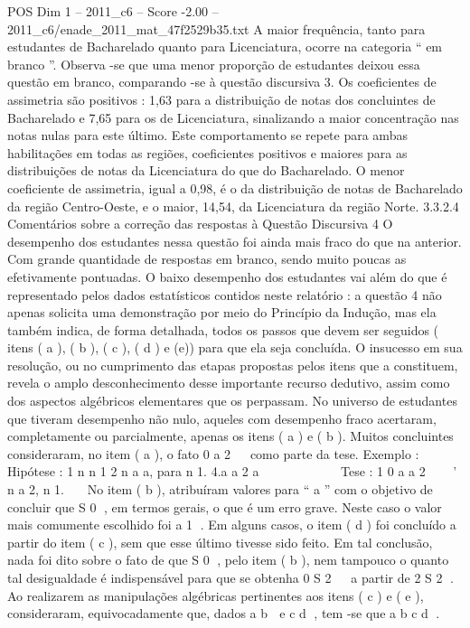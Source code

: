 \begin{textsample}{POS Dim 1 – 2011\_c6 – Score -2.00 – 2011\_c6/enade\_2011\_mat\_47f2529b35.txt}
A maior frequência, tanto para estudantes de Bacharelado quanto para Licenciatura, ocorre na categoria “ em branco ”.
Observa -se que uma menor proporção de estudantes deixou essa questão em branco, comparando -se à questão discursiva 3.
Os coeficientes de assimetria são positivos : 1,63 para a distribuição de notas dos concluintes de Bacharelado e 7,65 para os de Licenciatura, sinalizando a maior concentração nas notas nulas para este último.
Este comportamento se repete para ambas habilitações em todas as regiões, coeficientes positivos e maiores para as distribuições de notas da Licenciatura do que do Bacharelado.
O menor coeficiente de assimetria, igual a 0,98, é o da distribuição de notas de Bacharelado da região Centro-Oeste, e o maior, 14,54, da Licenciatura da região Norte. 3.3.2.4 Comentários sobre a correção das respostas à Questão Discursiva 4 O desempenho dos estudantes nessa questão foi ainda mais fraco do que na anterior.
Com grande quantidade de respostas em branco, sendo muito poucas as efetivamente pontuadas.
O baixo desempenho dos estudantes vai além do que é representado pelos dados estatísticos contidos neste relatório : a questão 4 não apenas solicita uma demonstração por meio do Princípio da Indução, mas ela também indica, de forma detalhada, todos os passos que devem ser seguidos ( itens ( a ), ( b ), ( c ), ( d ) e (e)) para que ela seja concluída.
O insucesso em sua resolução, ou no cumprimento das etapas propostas pelos itens que a constituem, revela o amplo desconhecimento desse importante recurso dedutivo, assim como dos aspectos algébricos elementares que os perpassam.
No universo de estudantes que tiveram desempenho não nulo, aqueles com desempenho fraco acertaram, completamente ou parcialmente, apenas os itens ( a ) e ( b ).
Muitos concluintes consideraram, no item ( a ), o fato 0 a 2   como parte da tese.
Exemplo : Hipótese : 1 n n 1 2 n a a, para n 1. 4.a a 2 a           Tese : 1 0 a a 2    ' n a 2, n 1.   No item ( b ), atribuíram valores para “ a ” com o objetivo de concluir que S 0 , em termos gerais, o que é um erro grave.
Neste caso o valor mais comumente escolhido foi a 1 .
Em alguns casos, o item ( d ) foi concluído a partir do item ( c ), sem que esse último tivesse sido feito.
Em tal conclusão, nada foi dito sobre o fato de que S 0 , pelo item ( b ), nem tampouco o quanto tal desigualdade é indispensável para que se obtenha 0 S 2   a partir de 2 S 2 .
Ao realizarem as manipulações algébricas pertinentes aos itens ( c ) e ( e ), consideraram, equivocadamente que, dados a b  e c d , tem -se que a b c d .

\end{textsample}
